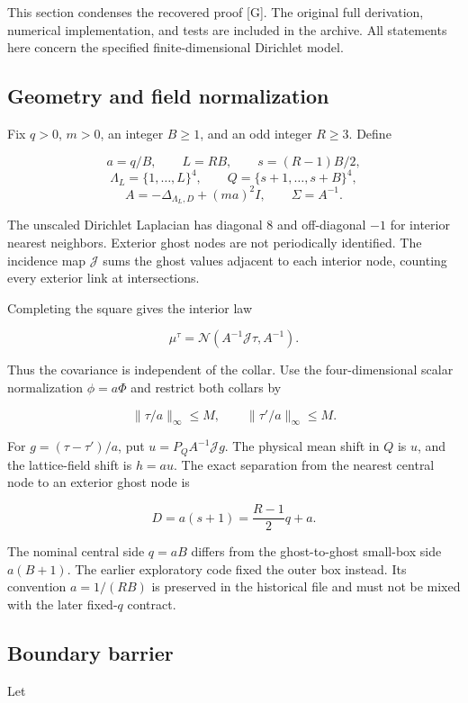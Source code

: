 \documentclass[
  11pt,
  letterpaper,
]{article}
\begin{document}
This section condenses the recovered proof {[}G{]}. The original full
derivation, numerical implementation, and tests are included in the
archive. All statements here concern the specified finite-dimensional
Dirichlet model.

\subsection{Geometry and field
normalization}\label{geometry-and-field-normalization}

Fix \(q>0\), \(m>0\), an integer \(B\ge1\), and an odd integer
\(R\ge3\). Define

\[
a=q/B,\qquad L=RB,\qquad s=(R-1)B/2,
\] \[
\Lambda_L=\{1,\ldots,L\}^4,\qquad
Q=\{s+1,\ldots,s+B\}^4,
\] \[
A=-\Delta_{\Lambda_L,D}+(ma)^2 I,\qquad \Sigma=A^{-1}.
\]

The unscaled Dirichlet Laplacian has diagonal 8 and off-diagonal \(-1\)
for interior nearest neighbors. Exterior ghost nodes are not
periodically identified. The incidence map \(\mathcal J\) sums the ghost
values adjacent to each interior node, counting every exterior link at
intersections.

Completing the square gives the interior law

\[
\mu^\tau=\mathcal N(A^{-1}\mathcal J\tau,A^{-1}).
\]

Thus the covariance is independent of the collar. Use the
four-dimensional scalar normalization \(\phi=a\Phi\) and restrict both
collars by

\[
\|\tau/a\|_\infty\le M,\qquad
\|\tau'/a\|_\infty\le M.
\]

For \(g=(\tau-\tau')/a\), put \(u=P_QA^{-1}\mathcal Jg\). The physical
mean shift in \(Q\) is \(u\), and the lattice-field shift is \(h=au\).
The exact separation from the nearest central node to an exterior ghost
node is

\[
D=a(s+1)=\frac{R-1}{2}q+a.
\]

The nominal central side \(q=aB\) differs from the ghost-to-ghost
small-box side \(a(B+1)\). The earlier exploratory code fixed the outer
box instead. Its convention \(a=1/(RB)\) is preserved in the historical
file and must not be mixed with the later fixed-\(q\) contract.

\subsection{Boundary barrier}\label{boundary-barrier}

Let
\end{document}
